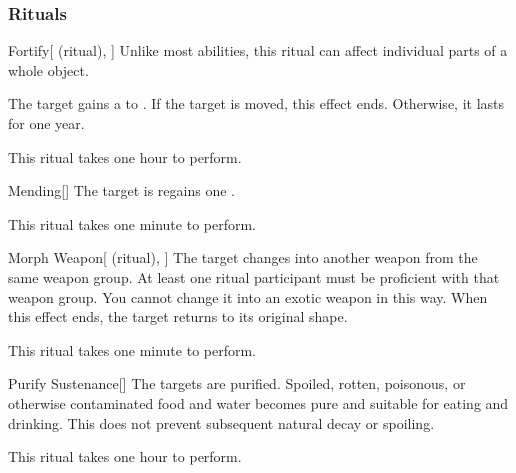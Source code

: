 \subsubsection{Rituals}


\lowercase{\hypertarget{spell:Fortify}{}}\label{spell:Fortify}
\begin{attuneability}[Rank 1]{\hypertarget{spell:Fortify}{Fortify}}[ (ritual), ]
Unlike most abilities, this ritual can affect individual parts of a whole object.

The target gains a   to .
If the target is moved, this effect ends.
Otherwise, it lasts for one year.

This ritual takes one hour to perform.
\end{attuneability}
\vspace{0.25em}



\lowercase{\hypertarget{spell:Mending}{}}\label{spell:Mending}
\begin{apability}[Rank 1]{\hypertarget{spell:Mending}{Mending}}[]
The target is regains one .

This ritual takes one minute to perform.
\end{apability}
\vspace{0.25em}



\lowercase{\hypertarget{spell:Morph Weapon}{}}\label{spell:Morph Weapon}
\begin{attuneability}[Rank 1]{\hypertarget{spell:Morph Weapon}{Morph Weapon}}[ (ritual), ]
The target changes into another weapon from the same weapon group.
At least one ritual participant must be proficient with that weapon group.
You cannot change it into an exotic weapon in this way.
When this effect ends, the target returns to its original shape.

This ritual takes one minute to perform.
\end{attuneability}
\vspace{0.25em}



\lowercase{\hypertarget{spell:Purify Sustenance}{}}\label{spell:Purify Sustenance}
\begin{apability}[Rank 1]{\hypertarget{spell:Purify Sustenance}{Purify Sustenance}}[]
The targets are purified.
Spoiled, rotten, poisonous, or otherwise contaminated food and water becomes pure and suitable for eating and drinking.
This does not prevent subsequent natural decay or spoiling.

This ritual takes one hour to perform.
\end{apability}
\vspace{0.25em}



